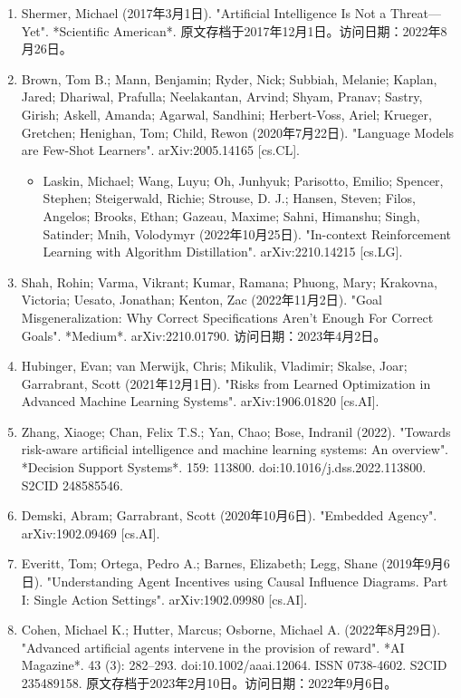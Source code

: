 \begin{enumerate}
\item Shermer, Michael (2017年3月1日). "Artificial Intelligence Is Not a Threat—Yet". *Scientific American*. 原文存档于2017年12月1日。访问日期：2022年8月26日。
\item Brown, Tom B.; Mann, Benjamin; Ryder, Nick; Subbiah, Melanie; Kaplan, Jared; Dhariwal, Prafulla; Neelakantan, Arvind; Shyam, Pranav; Sastry, Girish; Askell, Amanda; Agarwal, Sandhini; Herbert-Voss, Ariel; Krueger, Gretchen; Henighan, Tom; Child, Rewon (2020年7月22日). "Language Models are Few-Shot Learners". arXiv:2005.14165 [cs.CL].
\begin{itemize}
\item Laskin, Michael; Wang, Luyu; Oh, Junhyuk; Parisotto, Emilio; Spencer, Stephen; Steigerwald, Richie; Strouse, D. J.; Hansen, Steven; Filos, Angelos; Brooks, Ethan; Gazeau, Maxime; Sahni, Himanshu; Singh, Satinder; Mnih, Volodymyr (2022年10月25日). "In-context Reinforcement Learning with Algorithm Distillation". arXiv:2210.14215 [cs.LG].
\end{itemize}
\item Shah, Rohin; Varma, Vikrant; Kumar, Ramana; Phuong, Mary; Krakovna, Victoria; Uesato, Jonathan; Kenton, Zac (2022年11月2日). "Goal Misgeneralization: Why Correct Specifications Aren't Enough For Correct Goals". *Medium*. arXiv:2210.01790. 访问日期：2023年4月2日。
\item Hubinger, Evan; van Merwijk, Chris; Mikulik, Vladimir; Skalse, Joar; Garrabrant, Scott (2021年12月1日). "Risks from Learned Optimization in Advanced Machine Learning Systems". arXiv:1906.01820 [cs.AI].
\item Zhang, Xiaoge; Chan, Felix T.S.; Yan, Chao; Bose, Indranil (2022). "Towards risk-aware artificial intelligence and machine learning systems: An overview". *Decision Support Systems*. 159: 113800. doi:10.1016/j.dss.2022.113800. S2CID 248585546.
\item Demski, Abram; Garrabrant, Scott (2020年10月6日). "Embedded Agency". arXiv:1902.09469 [cs.AI].
\item Everitt, Tom; Ortega, Pedro A.; Barnes, Elizabeth; Legg, Shane (2019年9月6日). "Understanding Agent Incentives using Causal Influence Diagrams. Part I: Single Action Settings". arXiv:1902.09980 [cs.AI].
\item Cohen, Michael K.; Hutter, Marcus; Osborne, Michael A. (2022年8月29日). "Advanced artificial agents intervene in the provision of reward". *AI Magazine*. 43 (3): 282–293. doi:10.1002/aaai.12064. ISSN 0738-4602. S2CID 235489158. 原文存档于2023年2月10日。访问日期：2022年9月6日。

\end{enumerate}
